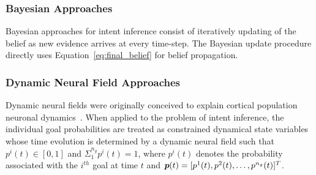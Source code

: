 \documentclass[letterpaper, 10 pt, conference]{ieeeconf}  %
\begin{document}
\subsubsection{Bayesian Approaches}
Bayesian approaches for intent inference consist of iteratively updating of the belief as new evidence arrives at every time-step. The Bayesian update procedure directly uses Equation~\ref{eq:final_belief} for belief propagation. 


\subsubsection{Dynamic Neural Field Approaches}
Dynamic neural fields were originally conceived to explain cortical population neuronal dynamics~\cite{schoner2008dynamical}. 
When applied to the problem of intent inference, the individual goal probabilities are treated as constrained dynamical state variables whose time evolution is determined by a dynamic neural field such that $p^i(t) \in [0, 1]$ and $\Sigma_{1}^{n_g}p^{i}(t) = 1$, where $p^i(t)$ denotes the probability associated with the $i^{th}$ goal at time $t$ and $\textit{\textbf{p}}(t) = [p^1(t), p^2(t),\dots,p^{n_g}(t) ]^{T}$. 
\end{document}
